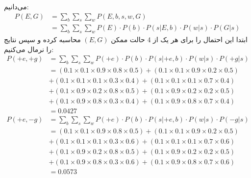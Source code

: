 \begin{ابجد}
\item می‌دانیم:
\begin{align*}
    P(E, G) & = \sum_b\sum_s\sum_w P(E, b, s, w, G)                                         \\
            & = \sum_b\sum_s\sum_w P(E) \cdot P(b) \cdot P(s|E,b) \cdot P(w|s) \cdot P(G|s)
\end{align*}
ابتدا این احتمال را برای هر یک از 4 حالت ممکن $(E, G)$ محاسبه کرده و سپس نتایج را نرمال می‌کنیم:
\begin{align*}
    P(+e, +g) & = \sum_b\sum_s\sum_w P(+e) \cdot P(b) \cdot P(s|+e,b) \cdot P(w|s) \cdot P(+g|s)                        \\
              & = (0.1 \times 0.1 \times 0.9 \times 0.8 \times 0.5) + (0.1 \times 0.1 \times 0.9 \times 0.2 \times 0.5) \\
              & + (0.1 \times 0.1 \times 0.1 \times 0.3 \times 0.4) + (0.1 \times 0.1 \times 0.1 \times 0.7 \times 0.4) \\
              & + (0.1 \times 0.9 \times 0.2 \times 0.8 \times 0.5) + (0.1 \times 0.9 \times 0.2 \times 0.2 \times 0.5) \\
              & + (0.1 \times 0.9 \times 0.8 \times 0.3 \times 0.4) + (0.1 \times 0.9 \times 0.8 \times 0.7 \times 0.4) \\
              & = 0.0427                                                                                                \\
    P(+e, -g) & = \sum_b\sum_s\sum_w P(+e) \cdot P(b) \cdot P(s|+e,b) \cdot P(w|s) \cdot P(-g|s)                        \\
              & = (0.1 \times 0.1 \times 0.9 \times 0.8 \times 0.5) + (0.1 \times 0.1 \times 0.9 \times 0.2 \times 0.5) \\
              & + (0.1 \times 0.1 \times 0.1 \times 0.3 \times 0.6) + (0.1 \times 0.1 \times 0.1 \times 0.7 \times 0.6) \\
              & + (0.1 \times 0.9 \times 0.2 \times 0.8 \times 0.5) + (0.1 \times 0.9 \times 0.2 \times 0.2 \times 0.5) \\
              & + (0.1 \times 0.9 \times 0.8 \times 0.3 \times 0.6) + (0.1 \times 0.9 \times 0.8 \times 0.7 \times 0.6) \\
              & = 0.0573
\end{align*}


\end{ابجد}
